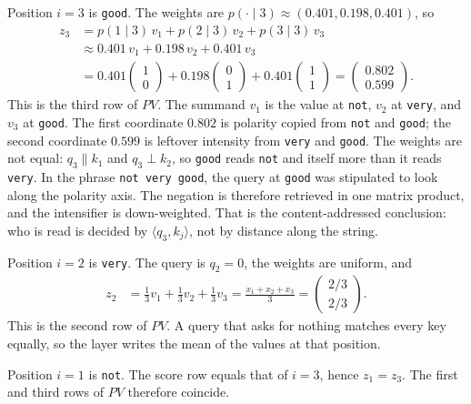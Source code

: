 \documentclass[11pt,a4paper]{article}
\theoremstyle{definition}
\begin{document}
\begin{example}
Position \(i=3\) is \texttt{good}. The weights are \(p(\cdot\mid 3)\approx(0.401,0.198,0.401)\), so
\begin{align*}
z_3
&=p(1\mid 3)\,v_1+p(2\mid 3)\,v_2+p(3\mid 3)\,v_3
\\
&\approx 0.401\,v_1+0.198\,v_2+0.401\,v_3
\\
&=0.401\begin{pmatrix}1\\0\end{pmatrix}
+0.198\begin{pmatrix}0\\1\end{pmatrix}
+0.401\begin{pmatrix}1\\1\end{pmatrix}
=\begin{pmatrix}0.802\\0.599\end{pmatrix}.
\end{align*}
This is the third row of \(PV\). The summand \(v_1\) is the value at \texttt{not}, \(v_2\) at \texttt{very}, and \(v_3\) at \texttt{good}. The first coordinate \(0.802\) is polarity copied from \texttt{not} and \texttt{good}; the second coordinate \(0.599\) is leftover intensity from \texttt{very} and \texttt{good}. The weights are not equal: \(q_3\parallel k_1\) and \(q_3\perp k_2\), so \texttt{good} reads \texttt{not} and itself more than it reads \texttt{very}. In the phrase \texttt{not very good}, the query at \texttt{good} was stipulated to look along the polarity axis. The negation is therefore retrieved in one matrix product, and the intensifier is down-weighted. That is the content-addressed conclusion: who is read is decided by \(\langle q_3,k_j\rangle\), not by distance along the string.

Position \(i=2\) is \texttt{very}. The query is \(q_2=0\), the weights are uniform, and
\begin{align*}
z_2
&=\tfrac13 v_1+\tfrac13 v_2+\tfrac13 v_3
=\frac{x_1+x_2+x_3}{3}
=\begin{pmatrix}2/3\\2/3\end{pmatrix}.
\end{align*}
This is the second row of \(PV\). A query that asks for nothing matches every key equally, so the layer writes the mean of the values at that position.

Position \(i=1\) is \texttt{not}. The score row equals that of \(i=3\), hence \(z_1=z_3\). The first and third rows of \(PV\) therefore coincide.


\end{example}
\end{document}
